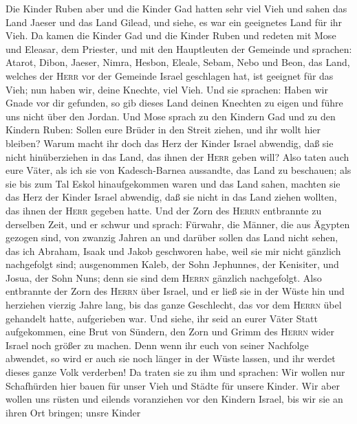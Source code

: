  Die Kinder Ruben aber und die Kinder Gad hatten sehr viel
Vieh und sahen das Land Jaeser und das Land Gilead, und siehe, es war
ein geeignetes Land für ihr Vieh.  Da kamen die Kinder Gad
und die Kinder Ruben und redeten mit Mose und Eleasar, dem Priester, und
mit den Hauptleuten der Gemeinde und sprachen:  Atarot,
Dibon, Jaeser, Nimra, Hesbon, Eleale, Sebam,  Nebo und
Beon, das Land, welches der \textsc{Herr} vor der Gemeinde Israel
geschlagen hat, ist geeignet für das Vieh; nun haben wir, deine Knechte,
viel Vieh.  Und sie sprachen: Haben wir Gnade vor dir
gefunden, so gib dieses Land deinen Knechten zu eigen und führe uns
nicht über den Jordan.  Und Mose sprach zu den Kindern Gad
und zu den Kindern Ruben: Sollen eure Brüder in den Streit ziehen, und
ihr wollt hier bleiben?  Warum macht ihr doch das Herz der
Kinder Israel abwendig, daß sie nicht hinüberziehen in das Land, das
ihnen der \textsc{Herr} geben will?  Also taten auch eure
Väter, als ich sie von Kadesch-Barnea aussandte, das Land zu beschauen;
 als sie bis zum Tal Eskol hinaufgekommen waren und das
Land sahen, machten sie das Herz der Kinder Israel abwendig, daß sie
nicht in das Land ziehen wollten, das ihnen der \textsc{Herr} gegeben
hatte.  Und der Zorn des \textsc{Herrn} entbrannte zu
derselben Zeit, und er schwur und sprach:  Fürwahr, die
Männer, die aus Ägypten gezogen sind, von zwanzig Jahren an und darüber
sollen das Land nicht sehen, das ich Abraham, Isaak und Jakob geschworen
habe, weil sie mir nicht gänzlich nachgefolgt sind; 
ausgenommen Kaleb, der Sohn Jephunnes, der Kenisiter, und Josua, der
Sohn Nuns; denn sie sind dem \textsc{Herrn} gänzlich nachgefolgt.
 Also entbrannte der Zorn des \textsc{Herrn} über Israel,
und er ließ sie in der Wüste hin und herziehen vierzig Jahre lang, bis
das ganze Geschlecht, das vor dem \textsc{Herrn} übel gehandelt hatte,
aufgerieben war.  Und siehe, ihr seid an eurer Väter
Statt aufgekommen, eine Brut von Sündern, den Zorn und Grimm des
\textsc{Herrn} wider Israel noch größer zu machen.  Denn
wenn ihr euch von seiner Nachfolge abwendet, so wird er auch sie noch
länger in der Wüste lassen, und ihr werdet dieses ganze Volk verderben!
 Da traten sie zu ihm und sprachen: Wir wollen nur
Schafhürden hier bauen für unser Vieh und Städte für unsere Kinder.
 Wir aber wollen uns rüsten und eilends voranziehen vor
den Kindern Israel, bis wir sie an ihren Ort bringen; unsre Kinder
